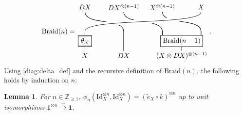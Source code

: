\documentclass[11pt, reqno]{amsart}
\newtheorem{lem}[thm]{Lemma}
\theoremstyle{definition}\newtheorem{defi}[thm]{Definition}
\theoremstyle{definition}\newtheorem{rem}[thm]{Remark}
\theoremstyle{definition}\newtheorem{exam}[thm]{Example}
\theoremstyle{definition}\newtheorem{assum}[thm]{Assumption}
\newcommand{\til}{\widetilde}
\newcommand{\ZZ}{\mathbb{Z}}
\newcommand{\Id}{\mathrm{Id}}
\newcommand{\vac}{\mathbf{1}}
\begin{document}
\begin{equation*}
\mathrm{Braid}(n)= \begin{matrix}
    \begin{tikzpicture}[scale = 1, baseline = {(current bounding box.center)}, line width=0.75pt]
    \node at (0,-.25) {$X$}; 
    \node at (2,-.25) {$DX$};
    \node at (5,-.25) {$(X\otimes DX)^{\otimes (n-1)}$};
    \node at (0,2.25) {$DX$}; 
    \node at (2,2.25) {$DX^{\otimes (n-1)}$}; 
    \node at (4,2.25) {$X^{\otimes (n-1)}$}; 
    \node at (6,2.25) {$X$}; 
    \draw (2,0) -- (2,1) .. controls (2,1.7) and (0,1.3) .. (0,2);
    \draw (5,0) -- (5,.5);
    \draw (4,.5) -- (4,1) .. controls (4,1.7) and (2,1.3) .. (2,2);
    \draw (6,.5) -- (6,1) .. controls (6,1.7) and (4,1.3) .. (4,2);
    \draw[white, double=black, line width = 3pt ] (0,0) -- (0,1) .. controls (0,1.7) and (6,1.3) .. (6,2);
    \node at (0,.5) [draw,minimum width=20pt,minimum height=10pt,thick, fill=white] {$\theta_{X}$};
    \node at (5,.5) [draw,minimum width=20pt,minimum height=10pt,thick, fill=white] {$\mathrm{Braid}(n-1)$};
    \end{tikzpicture}
    \end{matrix}.
\end{equation*}
Using \eqref{diag:delta_def} and the recursive definition of $\mathrm{Braid}(n)$, the following holds by induction on $n$:
\begin{lem}\label{lem:B(Id,Id)}
For $n\in\ZZ_{\geq 1}$, $\phi_n(\Id_X^{\otimes n},\Id_X^{\otimes n}) =(\til{e}_X\circ k)^{\otimes n}$
up to unit isomorphisms $\vac^{\otimes n}\xrightarrow{\sim}\vac$.
\end{lem}
\end{document}
